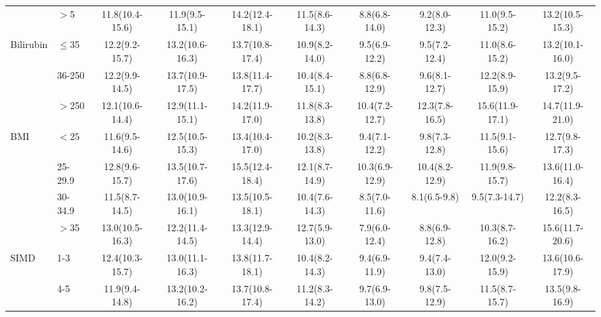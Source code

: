 \begin{sidewaystable}[p]
\begin{tabular}{|l l | cc cc cc cc|}
		                    & $>$5      & 11.8(10.4-15.6) & 11.9(9.5-15.1)  & 14.2(12.4-18.1) & 11.5(8.6-14.3) & 8.8(6.8-14.0)  & 9.2(8.0-12.3)  & 11.0(9.5-15.2)  & 13.2(10.5-15.3) \\
		Bilirubin           & $\leq$35  & 12.2(9.2-15.7)  & 13.2(10.6-16.3) & 13.7(10.8-17.4) & 10.9(8.2-14.0) & 9.5(6.9-12.2)  & 9.5(7.2-12.4)  & 11.0(8.6-15.2)  & 13.2(10.1-16.0) \\
		                    & 36-250    & 12.2(9.9-14.5)  & 13.7(10.9-17.5) & 13.8(11.4-17.7) & 10.4(8.4-15.1) & 8.8(6.8-12.9)  & 9.6(8.1-12.7)  & 12.2(8.9-15.9)  & 13.2(9.5-17.2)  \\
		                    & $>$250    & 12.1(10.6-14.4) & 12.9(11.1-15.1) & 14.2(11.9-17.0) & 11.8(8.3-13.8) & 10.4(7.2-12.7) & 12.3(7.8-16.5) & 15.6(11.9-17.1) & 14.7(11.9-21.0) \\
		BMI                 & $<25$     & 11.6(9.5-14.6)  & 12.5(10.5-15.3) & 13.4(10.4-17.0) & 10.2(8.3-13.8) & 9.4(7.1-12.2)  & 9.8(7.3-12.8)  & 11.5(9.1-15.6)  & 12.7(9.8-17.3)  \\
		                    & 25-29.9   & 12.8(9.6-15.7)  & 13.5(10.7-17.6) & 15.5(12.4-18.4) & 12.1(8.7-14.9) & 10.3(6.9-12.9) & 10.4(8.2-12.9) & 11.9(9.8-15.7)  & 13.6(11.0-16.4) \\
		                    & 30-34.9   & 11.5(8.7-14.5)  & 13.0(10.9-16.1) & 13.5(10.5-18.1) & 10.4(7.6-14.3) & 8.5(7.0-11.6)  &  8.1(6.5-9.8)  & 9.5(7.3-14.7)   & 12.2(8.3-16.5)  \\
		                    & $>$35     & 13.0(10.5-16.3) & 12.2(11.4-14.5) & 13.3(12.9-14.4) & 12.7(5.9-13.0) & 7.9(6.0-12.4)  & 8.8(6.9-12.8)  & 10.3(8.7-16.2)  & 15.6(11.7-20.6) \\
		SIMD                & 1-3       & 12.4(10.3-15.7) & 13.0(11.1-16.3) & 13.8(11.7-18.1) & 10.4(8.2-14.3) & 9.4(6.9-11.9)  & 9.4(7.4-13.0)  & 12.0(9.2-15.9)  & 13.6(10.6-17.9) \\
		                    & 4-5       & 11.9(9.4-14.8)  & 13.2(10.2-16.2) & 13.7(10.8-17.4) & 11.2(8.3-14.2) & 9.7(6.9-13.0)  & 9.8(7.5-12.9)  & 11.5(8.7-15.7)  & 13.5(9.8-16.9)  \\

\end{tabular}
\end{sidewaystable}
